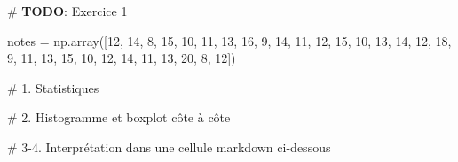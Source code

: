 \documentclass[
  french,
  11pt,
  a4paper,
]{scrbook}
\newenvironment{Shaded}{}{}
\newcommand{\AlertTok}[1]{\textcolor[rgb]{1.00,0.33,0.33}{\textbf{#1}}}
\newcommand{\CommentTok}[1]{\textcolor[rgb]{0.42,0.45,0.49}{#1}}
\newcommand{\DecValTok}[1]{\textcolor[rgb]{0.00,0.36,0.77}{#1}}
\newcommand{\NormalTok}[1]{\textcolor[rgb]{0.14,0.16,0.18}{#1}}
\newcommand{\OperatorTok}[1]{\textcolor[rgb]{0.14,0.16,0.18}{#1}}
\begin{document}
\begin{Shaded}
\begin{Highlighting}[]
\CommentTok{\# }\AlertTok{TODO}\CommentTok{: Exercice 1}

\NormalTok{notes }\OperatorTok{=}\NormalTok{ np.array([}\DecValTok{12}\NormalTok{, }\DecValTok{14}\NormalTok{, }\DecValTok{8}\NormalTok{, }\DecValTok{15}\NormalTok{, }\DecValTok{10}\NormalTok{, }\DecValTok{11}\NormalTok{, }\DecValTok{13}\NormalTok{, }\DecValTok{16}\NormalTok{, }\DecValTok{9}\NormalTok{, }\DecValTok{14}\NormalTok{, }
                  \DecValTok{11}\NormalTok{, }\DecValTok{12}\NormalTok{, }\DecValTok{15}\NormalTok{, }\DecValTok{10}\NormalTok{, }\DecValTok{13}\NormalTok{, }\DecValTok{14}\NormalTok{, }\DecValTok{12}\NormalTok{, }\DecValTok{18}\NormalTok{, }\DecValTok{9}\NormalTok{, }\DecValTok{11}\NormalTok{, }
                  \DecValTok{13}\NormalTok{, }\DecValTok{15}\NormalTok{, }\DecValTok{10}\NormalTok{, }\DecValTok{12}\NormalTok{, }\DecValTok{14}\NormalTok{, }\DecValTok{11}\NormalTok{, }\DecValTok{13}\NormalTok{, }\DecValTok{20}\NormalTok{, }\DecValTok{8}\NormalTok{, }\DecValTok{12}\NormalTok{])}

\CommentTok{\# 1. Statistiques}


\CommentTok{\# 2. Histogramme et boxplot côte à côte}


\CommentTok{\# 3{-}4. Interprétation dans une cellule markdown ci{-}dessous}
\end{Highlighting}
\end{Shaded}
\end{document}
